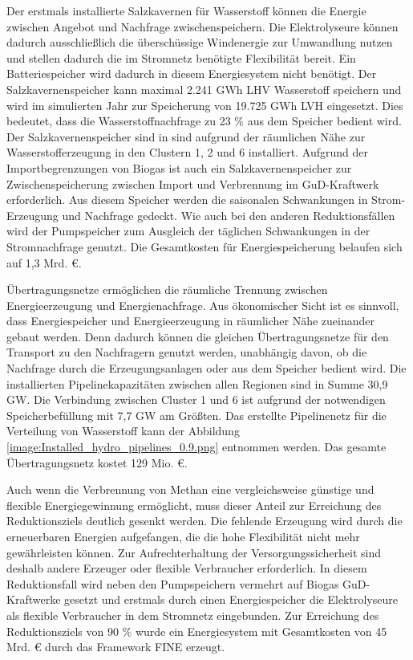 Der erstmals installierte Salzkavernen für Wasserstoff können die Energie zwischen Angebot und Nachfrage zwischenspeichern. Die Elektrolyseure können dadurch ausschließlich die überschüssige Windenergie zur Umwandlung nutzen und stellen dadurch die im Stromnetz benötigte Flexibilität bereit. Ein Batteriespeicher wird dadurch in diesem Energiesystem nicht benötigt.
Der Salzkavernenspeicher kann maximal 2.241 GWh LHV Wasserstoff speichern und wird im simulierten Jahr zur Speicherung von 19.725 GWh LVH eingesetzt. Dies bedeutet, dass die Wasserstoffnachfrage zu 23 \% aus dem Speicher bedient wird. Der Salzkavernenspeicher sind in sind aufgrund der räumlichen Nähe zur Wasserstofferzeugung in den Clustern 1, 2 und 6 installiert.
Aufgrund der Importbegrenzungen von Biogas ist auch ein Salzkavernenspeicher zur Zwischenspeicherung zwischen Import und Verbrennung im GuD-Kraftwerk erforderlich. Aus diesem Speicher werden die saisonalen Schwankungen in Strom-Erzeugung und Nachfrage gedeckt.
Wie auch bei den anderen Reduktionsfällen wird der Pumpspeicher zum Ausgleich der täglichen Schwankungen in der Stromnachfrage genutzt. 
Die Gesamtkosten für Energiespeicherung belaufen sich auf 1,3 Mrd. €.


Übertragungsnetze ermöglichen die räumliche Trennung zwischen Energieerzeugung und Energienachfrage. 
Aus ökonomischer Sicht ist es sinnvoll, dass Energiespeicher und Energieerzeugung in räumlicher Nähe zueinander gebaut werden. Denn dadurch können die gleichen Übertragungsnetze für den Transport zu den Nachfragern genutzt werden, unabhängig davon, ob die Nachfrage durch die Erzeugungsanlagen oder aus dem Speicher bedient wird. 
Die installierten Pipelinekapazitäten zwischen allen Regionen sind in Summe 30,9 GW. Die Verbindung zwischen Cluster 1 und 6 ist aufgrund der notwendigen Speicherbefüllung mit 7,7 GW am Größten.
Das erstellte Pipelinenetz für die Verteilung von Wasserstoff kann der Abbildung \ref{image:Installed_hydro_pipelines_0.9.png} entnommen werden. Das gesamte Übertragungsnetz kostet 129 Mio. €.

Auch wenn die Verbrennung von Methan eine vergleichsweise günstige und flexible Energiegewinnung ermöglicht, muss dieser Anteil zur Erreichung des Reduktionsziels deutlich gesenkt werden. Die fehlende Erzeugung wird durch die erneuerbaren Energien aufgefangen, die die hohe Flexibilität nicht mehr gewährleisten können. Zur Aufrechterhaltung der Versorgungssicherheit sind deshalb andere Erzeuger oder flexible Verbraucher erforderlich. In diesem Reduktionsfall wird neben den Pumpspeichern vermehrt auf Biogas GuD-Kraftwerke gesetzt und erstmals durch einen Energiespeicher die Elektrolyseure als flexible Verbraucher in dem Stromnetz eingebunden.
Zur Erreichung des Reduktionsziels von 90 \% wurde ein Energiesystem mit Gesamtkosten von 45 Mrd. € durch das Framework FINE erzeugt.


